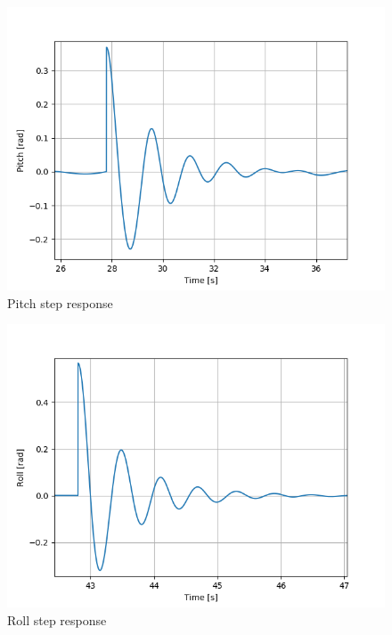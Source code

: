 \documentclass[11pt, letterpaper]{article}
\newif\ifoverleaf %
\begin{document}
\begin{figure}[hbt!]
\centering
\includegraphics[width=0.6\linewidth]{./src/usv_param_est/pitch_step.png}
\caption{Pitch step response}
\label{f:p}
\end{figure}

\begin{figure}[hbt!]
\centering
\includegraphics[width=0.6\linewidth]{./src/usv_param_est/roll_step.png}
\caption{Roll step response}
\label{f:r}
\end{figure}


\clearpage



\ifoverleaf

\else

\fi
\end{document}

